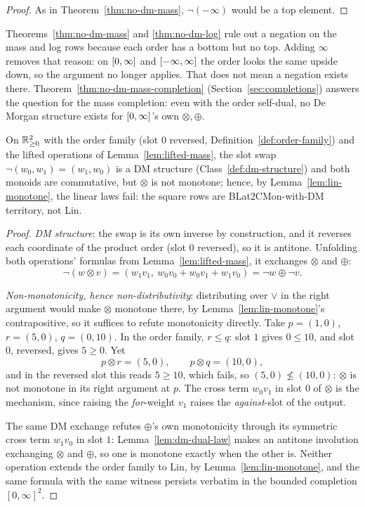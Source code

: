 \begin{proof}
\leanok
As in Theorem~\ref{thm:no-dm-mass}, $\neg(-\infty)$ would be a top
element.
\end{proof}

Theorems~\ref{thm:no-dm-mass} and \ref{thm:no-dm-log} rule out a
negation on the mass and log rows because each order has a bottom but
no top. Adding $\infty$ removes that reason: on $[0,\infty]$ and
$[-\infty,\infty]$ the order looks the same upside down, so the argument no
longer applies. That does not mean a negation exists there.
Theorem~\ref{thm:no-dm-mass-completion} (Section~\ref{sec:completions})
answers the question for the mass completion: even with the order
self-dual, no De Morgan structure exists for $[0,\infty]$'s own
$\otimes,\oplus$.

\begin{theorem}
\label{thm:square-not-lin}
\leanok
On $\mathbb R_{\ge 0}^2$ with the order family (slot $0$ reversed,
Definition~\ref{def:order-family}) and the lifted operations of
Lemma~\ref{lem:lifted-mass}, the slot swap
$\neg(w_0,w_1) = (w_1,w_0)$ is a DM structure
(Class~\ref{def:dm-structure}) and both monoids are commutative,
but $\otimes$ is not monotone; hence, by Lemma~\ref{lem:lin-monotone},
the linear laws fail: the square rows are BLat2CMon-with-DM territory,
not Lin.
\end{theorem}

\begin{proof}
\leanok
\emph{DM structure}: the swap is its own inverse by construction, and
it reverses each coordinate of the product order (slot $0$ reversed),
so it is antitone. Unfolding both operations' formulas from
Lemma~\ref{lem:lifted-mass}, it exchanges $\otimes$ and $\oplus$:
\[
  \neg(w \otimes v) = (w_1v_1,\ w_0v_0+w_0v_1+w_1v_0) = \neg w \oplus \neg v.
\]

\emph{Non-monotonicity, hence non-distributivity}: distributing over
$\vee$ in the right argument would make $\otimes$ monotone there, by
Lemma~\ref{lem:lin-monotone}'s contrapositive, so it suffices to refute
monotonicity directly. Take $p = (1,0)$, $r = (5,0)$, $q = (0,10)$. In
the order family, $r \le q$: slot $1$ gives $0 \le 10$, and slot $0$,
reversed, gives $5 \ge 0$. Yet
\[
  p \otimes r = (5,0), \qquad p \otimes q = (10,0),
\]
and in the reversed slot this reads $5 \ge 10$, which fails, so
$(5,0) \not\le (10,0)$: $\otimes$ is not monotone in its right
argument at $p$. The cross term $w_0v_1$ in slot $0$ of $\otimes$ is
the mechanism, since raising the \emph{for}-weight $v_1$ raises the
\emph{against}-slot of the output.

The same DM exchange refutes $\oplus$'s own monotonicity through its
symmetric cross term $w_1v_0$ in slot $1$: Lemma~\ref{lem:dm-dual-law}
makes an antitone involution exchanging $\otimes$ and $\oplus$, so one
is monotone exactly when the other is. Neither operation extends the
order family to Lin, by Lemma~\ref{lem:lin-monotone}, and the same
formula with the same witness persists verbatim in the bounded
completion $[0,\infty]^2$.
\end{proof}

